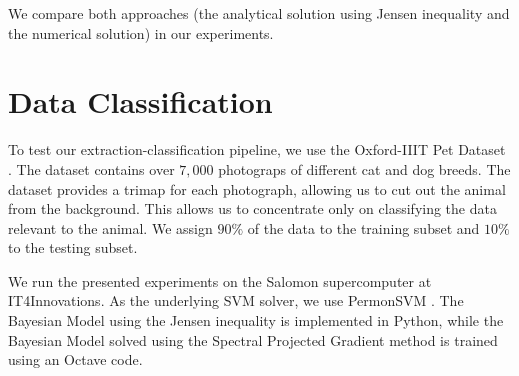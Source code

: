 \documentclass{aip-cp}
\begin{document}
We compare both approaches (the analytical solution using Jensen inequality and the numerical solution) in our experiments.

\section{Data Classification}
To test our extraction-classification pipeline, we use the Oxford-IIIT Pet Dataset \cite{parkhi12a}. The dataset contains over $7,000$ photograps of different cat and dog breeds. The dataset provides a trimap for each photograph, allowing us to cut out the animal from the background. This allows us to concentrate only on classifying the data relevant to the animal. We assign $90\%$ of the data to the training subset and $10\%$ to the testing subset.

We run the presented experiments on the Salomon supercomputer \cite{Salomon-WWW-17} at IT4Innovations. As the underlying SVM solver, we use PermonSVM \cite{permonSVM}. The Bayesian Model using the Jensen inequality is implemented in Python, while the Bayesian Model solved using the Spectral Projected Gradient method is trained using an Octave code.
\end{document}
